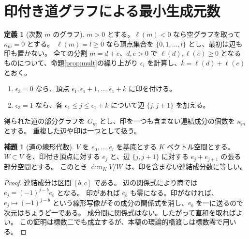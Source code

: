 \documentclass[11pt,a4paper]{ltjsarticle}
\numberwithin{equation}{section}
\theoremstyle{definition}
\newtheorem{lemma}[theorem]{補題}
\newtheorem{definition}[theorem]{定義}
\begin{document}
\section{印付き道グラフによる最小生成元数}\label{sec:path}
\begin{definition}[次数 $m$ のグラフ]\label{def:path}
$m>0$ とする。$\ell(m)<0$ なら空グラフを取って $\kappa_m=0$ とする。
$\ell(m)=l\ge0$ なら頂点集合を $\{0,1,\dots,l\}$ とし、最初は辺も印も置かない。
全ての分割 $m=d+e$、$d,e>0$ で $\ell(d),\ell(e)\ge0$ となるものについて、命題\ref{prop:mult}の繰り上がり $\epsilon_i$ を計算し、$k=\ell(d)+\ell(e)$ とおく。
\begin{enumerate}
\item $\epsilon_3=0$ なら、頂点 $\epsilon_1,\epsilon_1+1,\dots,\epsilon_1+k$ に印を付ける。
\item $\epsilon_3=1$ なら、各 $\epsilon_1\le j\le\epsilon_1+k$ について辺 $\{j,j+1\}$ を加える。
\end{enumerate}
得られた道の部分グラフを $G_m$ とし、印を一つも含まない連結成分の個数を $\kappa_m$ とする。
重複した辺や印は一つとして扱う。
\end{definition}

\begin{lemma}[道の線形代数]\label{lem:path-linear}
$V$ を $e_0,\dots,e_l$ を基底とする $K$ ベクトル空間とする。
$W\subset V$ を、印付き頂点に対する $e_j$ と、辺 $\{j,j+1\}$ に対する $e_j+e_{j+1}$ の張る部分空間とする。
このとき $\dim_K V/W$ は、印を含まない連結成分数に等しい。
\end{lemma}
\begin{proof}
連結成分は区間 $[b,c]$ である。
辺の関係式により商では $e_j=(-1)^{j-b}e_b$ となる。
印があれば $e_b$ も零になる。印がなければ、$e_j\mapsto(-1)^{j-b}$ という線形写像がその成分の関係式を消し、$e_b$ を一に送るので次元はちょうど一である。
成分間に関係式はない。したがって直和を取ればよい。
この証明は標数二でも成立するが、本稿の環論的橋渡しは標数零で用いる。
\end{proof}
\end{document}
